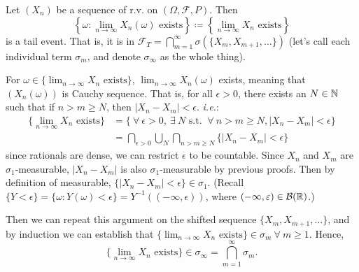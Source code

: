 \documentclass[class=article,crop=false]{standalone}
\begin{document}
\begin{thm}[]
	Let $(X_n) $ be a sequence of r.v. on $ (\Omega,\mathcal{F},P)$. Then
	\[
		\left\{ \omega: \lim_{ n \to \infty} X_n(\omega) \text{ exists}  \right\} \coloneqq \left\{ \lim_{ n \to \infty} X_n \text{ exists}  \right\}  
	\]
	is a tail event. That is, it is in $ \mathcal{F}_T = \bigcap_{ m =1}^{\infty} \sigma(\{X_m,X_{m+1},\ldots\} )$ (let's call each individual term $ \sigma_m$, and denote $ \sigma_{\infty}$ as the whole thing).
\end{thm}

\begin{prf}
	For $ \omega \in \{\lim_{ n \to \infty} X_n \text{ exists} \} $, $ \lim_{ n \to \infty} X_n(\omega)$ exists, meaning that $ (X_n(\omega))$ is Cauchy sequence. That is, for all $ \epsilon>0$, there exists an $ N \in \mathbb{N}$ such that if $ n>m \geq N$, then  $ |X_n - X_m|< \epsilon$. \emph{i.e.}:
	\begin{align*}
		\{\lim_{ n \to \infty} X_n \text{ exists} \} &= \{ \ \forall \ \epsilon>0, \ \exists \ N \text{ s.t. } \ \forall \ n>m\geq N, |X_n - X_m|< \epsilon\}  \\
		&= \bigcap_{ \epsilon>0} \bigcup_{ N} \bigcap_{ n>m\geq N} \{|X_n - X_m|< \epsilon\} 
       \end{align*}
       since rationals are dense, we can restrict $\epsilon$ to be countable. Since $ X_n$ and $X_m$ are $ \sigma_1$-measurable, $ |X_n-X_m|$ is also $ \sigma_1$-measurable by previous proofs. Then by definition of measurable, $ \{|X_n - X_m|< \epsilon\} \in \sigma_1 $. (Recall $ \{Y< \epsilon\} = \{\omega: Y(\omega) < \epsilon\} = Y^{-1}((-\infty, \epsilon))  $, where $ (- \infty, \varepsilon) \in \mathcal{B}( \mathbb{R})$.) 

       Then we can repeat this argument on the shifted sequence $ \{X_m,X_{m+1},\ldots\} $, and by induction we can establish that $ \{\lim_{ n \to \infty} X_n \text{ exists} \} \in \sigma_m \ \forall \ m\geq 1$. Hence,
       \[
       \{\lim_{ n \to \infty} X_n \text{ exists} \} \in \sigma_{\infty} = \bigcap_{ m=1}^{ \infty} \sigma_m  
       .\] 
\end{prf}
\end{document}
